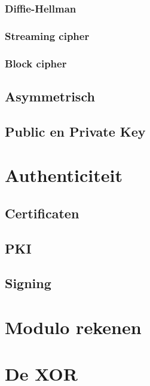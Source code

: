 \documentclass[a4paper,12pt,twoside,openright,titlepage]{book}
\begin{document}
\subsection{Diffie-Hellman}

\subsection{Streaming cipher}

\subsection{Block cipher}
\section{Asymmetrisch}

\section{Public en Private Key}


\chapter{Authenticiteit}

\section{Certificaten}

\section{PKI}

\section{Signing}


\begin{appendices}
	\chapter{Modulo rekenen}\label{chap:modulo}

	\chapter{De XOR}\label{chap:xor}

\end{appendices}

\printindex
\end{document}
